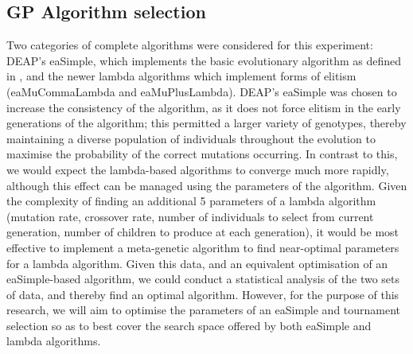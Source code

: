 \documentclass[british,10pt,a4paper]{article}
\begin{document}
\subsection{GP Algorithm selection}
Two categories of complete algorithms were considered for this experiment: DEAP's eaSimple, which implements the basic evolutionary algorithm as defined in \citet{Back2000-og}, and the newer lambda algorithms which implement forms of elitism (eaMuCommaLambda and eaMuPlusLambda). DEAP's eaSimple was chosen to increase the consistency of the algorithm, as it does not force elitism in the early generations of the algorithm; this permitted a larger variety of genotypes, thereby maintaining a diverse population of individuals throughout the evolution to maximise the probability of the correct mutations occurring. In contrast to this, we would expect the lambda-based algorithms to converge much more rapidly, although this effect can be managed using the parameters of the algorithm. Given the complexity of finding an additional 5 parameters of a lambda algorithm (mutation rate, crossover rate, number of individuals to select from current generation, number of children to produce at each generation), it would be most effective to implement a meta-genetic algorithm to find near-optimal parameters for a lambda algorithm. Given this data, and an equivalent optimisation of an eaSimple-based algorithm, we could conduct a statistical analysis of the two sets of data, and thereby find an optimal algorithm. However, for the purpose of this research, we will aim to optimise the parameters of an eaSimple and tournament selection so as to best cover the search space offered by both eaSimple and lambda algorithms.
\end{document}
